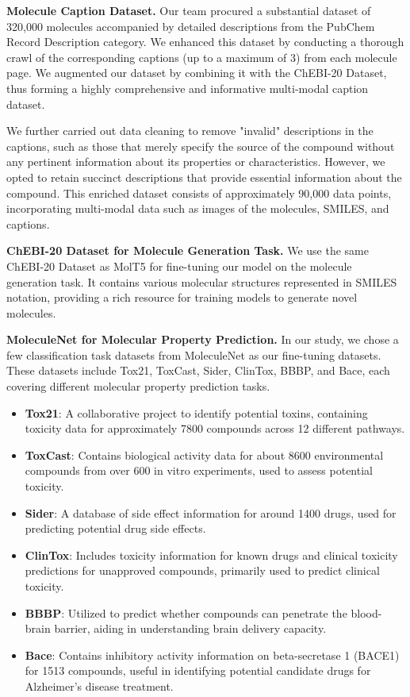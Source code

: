 \documentclass{article}
\begin{document}
\textbf{Molecule Caption Dataset.} Our team procured a substantial dataset of 320,000 molecules accompanied by detailed descriptions from the PubChem Record Description category. We enhanced this dataset by conducting a thorough crawl of the corresponding captions (up to a maximum of 3) from each molecule page. We augmented our dataset by combining it with the ChEBI-20 Dataset, thus forming a highly comprehensive and informative multi-modal caption dataset.

We further carried out data cleaning to remove "invalid" descriptions in the captions, such as those that merely specify the source of the compound without any pertinent information about its properties or characteristics. However, we opted to retain succinct descriptions that provide essential information about the compound. This enriched dataset consists of approximately 90,000 data points, incorporating multi-modal data such as images of the molecules, SMILES, and captions.

\textbf{ChEBI-20 Dataset for Molecule Generation Task.} We use the same ChEBI-20 Dataset as MolT5 for fine-tuning our model on the molecule generation task. It contains various molecular structures represented in SMILES notation, providing a rich resource for training models to generate novel molecules. 

\textbf{MoleculeNet for Molecular Property Prediction.} In our study, we chose a few classification task datasets from MoleculeNet as our fine-tuning datasets. These datasets include Tox21, ToxCast, Sider, ClinTox, BBBP, and Bace, each covering different molecular property prediction tasks.
\begin{itemize}
\item \textbf{Tox21}: A collaborative project to identify potential toxins,  containing toxicity data for approximately 7800 compounds across 12 different pathways.
\item \textbf{ToxCast}: Contains biological activity data for about 8600 environmental compounds from over 600 in vitro experiments, used to assess potential toxicity.
\item \textbf{Sider}: A database of side effect information for around 1400 drugs, used for predicting potential drug side effects.
\item \textbf{ClinTox}: Includes toxicity information for known drugs and clinical toxicity predictions for unapproved compounds, primarily used to predict clinical toxicity.
\item \textbf{BBBP}: Utilized to predict whether compounds can penetrate the blood-brain barrier, aiding in understanding brain delivery capacity.
\item \textbf{Bace}: Contains inhibitory activity information on beta-secretase 1 (BACE1) for 1513 compounds, useful in identifying potential candidate drugs for Alzheimer's disease treatment.
\end{itemize}
\end{document}
